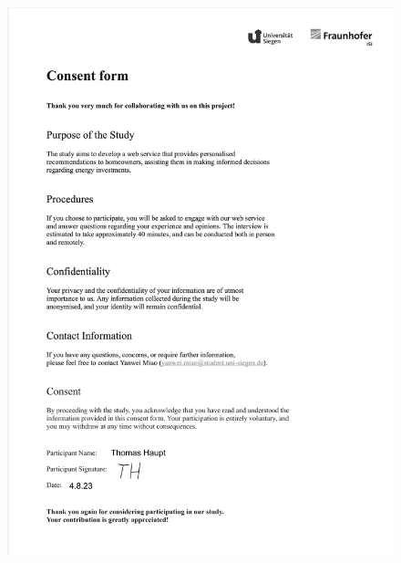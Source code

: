 \begin{figure}[h]
    \centering
    \includegraphics[width=\textwidth]{Images/consent_g.jpg}
\end{figure}

